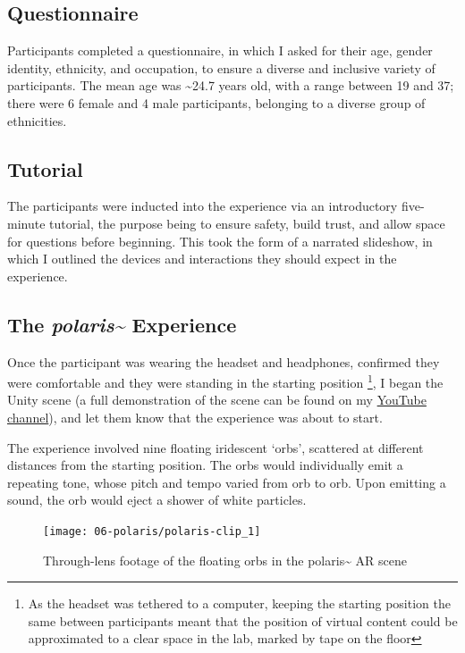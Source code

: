 \subsection{Questionnaire}\label{sec: polaris-study-questionnaire}
Participants completed a questionnaire, in which I asked for their age, gender identity, ethnicity, and occupation, to ensure a diverse and inclusive variety of participants. The mean age was \textasciitilde{}24.7 years old, with a range between 19 and 37; there were 6 female and 4 male participants, belonging to a diverse group of ethnicities.

\subsection{Tutorial}\label{sec: polaris-study-tutorial}
The participants were inducted into the experience via an introductory five-minute tutorial, the purpose being to ensure safety, build trust, and allow space for questions before beginning. This took the form of a narrated slideshow, in which I outlined the devices and interactions they should expect in the experience.

\subsection{The \textit{polaris\textasciitilde{}} Experience}\label{sec: polaris-study-experience}
Once the participant was wearing the headset and headphones, confirmed they were comfortable and they were standing in the starting position \footnote{As the headset was tethered to a computer, keeping the starting position the same between participants meant that the position of virtual content could be approximated to a clear space in the lab, marked by tape on the floor}, I began the Unity scene (a full demonstration of the scene can be found on my \href{https://youtu.be/lCBgMs8ULj0}{YouTube channel}), and let them know that the experience was about to start.

The experience involved nine floating iridescent `orbs', scattered at different distances from the starting position. The orbs would individually emit a repeating tone, whose pitch and tempo varied from orb to orb. Upon emitting a sound, the orb would eject a shower of white particles.

\begin{figure}[ht]
    \centering
    \texttt{[image: 06-polaris/polaris-clip\_1]}
    \captionsetup{justification=centering,margin=1.5cm}
    \caption{Through-lens footage of the floating orbs in the polaris\textasciitilde{} AR scene \citep[from][\href{https://youtu.be/lCBgMs8ULj0?t=19}{at 00:19}]{bilbow2022c}}\label{fig: polaris-clip_1}
\end{figure}

